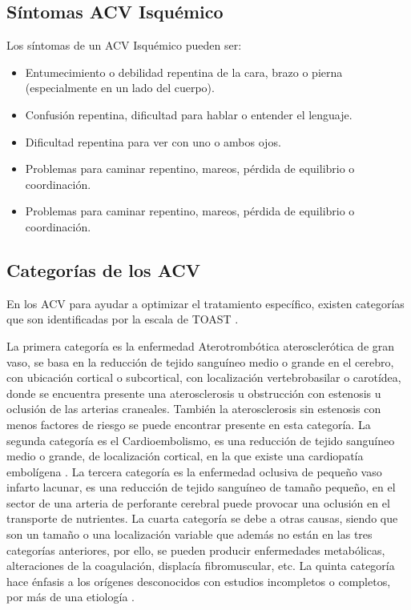 \doublespacing
\subsection{Síntomas ACV Isquémico}
\par Los síntomas de un ACV Isquémico pueden ser:
	\begin{itemize}
		\item Entumecimiento o debilidad repentina de la cara, brazo o pierna (especialmente en un lado del cuerpo).
		\item Confusión repentina, dificultad para hablar o entender el lenguaje.
		\item Dificultad repentina para ver con uno o ambos ojos.
		\item Problemas para caminar repentino, mareos, pérdida de equilibrio o coordinación.
		\item Problemas para caminar repentino, mareos, pérdida de equilibrio o coordinación.\\
	\end{itemize}
	
\doublespacing
\subsection{Categorías de los ACV}
\par En los ACV para ayudar a optimizar el tratamiento específico, existen categorías que son identificadas por la escala de TOAST \cite{Adams1993}.
\par La primera categoría es la enfermedad Aterotrombótica aterosclerótica de gran vaso, se basa en la reducción de tejido sanguíneo medio o grande en el cerebro, con ubicación cortical o subcortical, con localización vertebrobasilar o carotídea, donde se encuentra presente una aterosclerosis u obstrucción con estenosis u oclusión de las arterias craneales. También la aterosclerosis sin estenosis con menos factores de riesgo se puede encontrar presente en esta categoría. La segunda categoría es el Cardioembolismo, es una reducción de tejido sanguíneo medio o grande, de localización cortical, en la que existe una cardiopatía embolígena \cite{Molina2018}. La tercera categoría es la enfermedad oclusiva de pequeño vaso infarto lacunar, es una reducción de tejido sanguíneo de tamaño pequeño, en el sector de una arteria de perforante cerebral puede provocar una oclusión en el transporte de nutrientes. La cuarta categoría se debe a otras causas, siendo que son un tamaño o una localización variable que además no están en las tres categorías anteriores, por ello, se pueden producir enfermedades metabólicas, alteraciones de la coagulación, displacía fibromuscular, etc. La quinta categoría hace énfasis a los orígenes desconocidos con estudios incompletos o completos, por más de una etiología \cite{Radu2017}.\\


